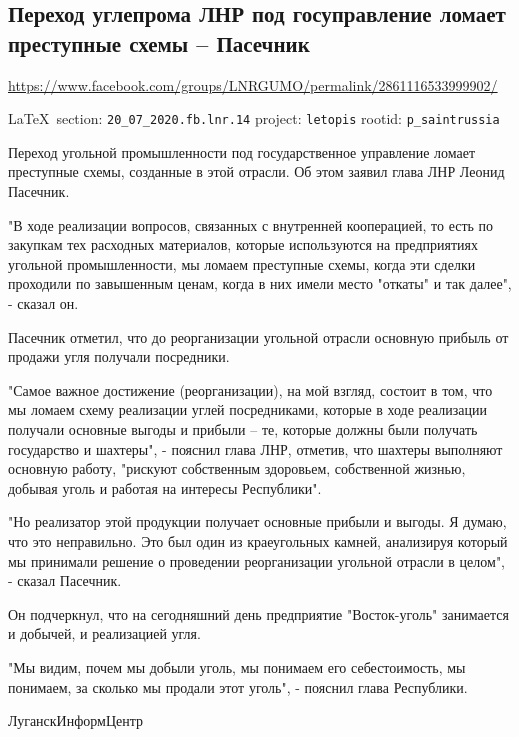  
 
  
  
\subsection{Переход углепрома ЛНР под госуправление ломает преступные схемы – Пасечник}
\url{https://www.facebook.com/groups/LNRGUMO/permalink/2861116533999902/}

\vspace{0.5cm}
{\small\LaTeX~section: \verb|20_07_2020.fb.lnr.14| project: \verb|letopis| rootid: \verb|p_saintrussia|}
\vspace{0.5cm}

Переход угольной промышленности под государственное управление ломает
преступные схемы, созданные в этой отрасли. Об этом заявил глава ЛНР Леонид
Пасечник.

"В ходе реализации вопросов, связанных с внутренней кооперацией, то есть по
закупкам тех расходных материалов, которые используются на предприятиях
угольной промышленности, мы ломаем преступные схемы, когда эти сделки проходили
по завышенным ценам, когда в них имели место "откаты" и так далее", - сказал
он.

Пасечник отметил, что до реорганизации угольной отрасли основную прибыль от
продажи угля получали посредники.

"Самое важное достижение (реорганизации), на мой взгляд, состоит в том, что мы
ломаем схему реализации углей посредниками, которые в ходе реализации получали
основные выгоды и прибыли – те, которые должны были получать государство и
шахтеры", - пояснил глава ЛНР, отметив, что шахтеры выполняют основную работу,
"рискуют собственным здоровьем, собственной жизнью, добывая уголь и работая на
интересы Республики".

"Но реализатор этой продукции получает основные прибыли и выгоды. Я думаю, что
это неправильно. Это был один из краеугольных камней, анализируя который мы
принимали решение о проведении реорганизации угольной отрасли в целом", -
сказал Пасечник.

Он подчеркнул, что на сегодняшний день предприятие "Восток-уголь" занимается и
добычей, и реализацией угля.

"Мы видим, почем мы добыли уголь, мы понимаем его себестоимость, мы понимаем,
за сколько мы продали этот уголь", - пояснил глава Республики.

ЛуганскИнформЦентр
